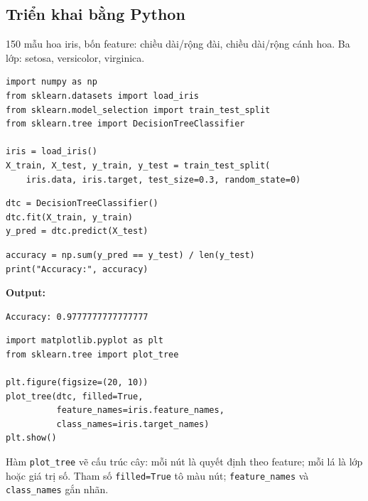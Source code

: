 \subsection{Triển khai bằng Python}

\begin{dongco}[title={Dataset Iris}]
150 mẫu hoa iris, bốn feature: chiều dài/rộng đài, chiều dài/rộng cánh hoa.
Ba lớp: setosa, versicolor, virginica.
\end{dongco}

\begin{vidu}[title={Import, nạp dữ liệu và chia tập}]
\begin{lstlisting}
import numpy as np
from sklearn.datasets import load_iris
from sklearn.model_selection import train_test_split
from sklearn.tree import DecisionTreeClassifier

iris = load_iris()
X_train, X_test, y_train, y_test = train_test_split(
    iris.data, iris.target, test_size=0.3, random_state=0)
\end{lstlisting}
\end{vidu}

\begin{vidu}[title={Huấn luyện và dự đoán}]
\begin{lstlisting}
dtc = DecisionTreeClassifier()
dtc.fit(X_train, y_train)
y_pred = dtc.predict(X_test)
\end{lstlisting}
\end{vidu}

\begin{vidu}[title={Độ chính xác}]
\begin{lstlisting}
accuracy = np.sum(y_pred == y_test) / len(y_test)
print("Accuracy:", accuracy)
\end{lstlisting}

\textbf{Output:}
\begin{verbatim}
Accuracy: 0.9777777777777777
\end{verbatim}
\end{vidu}

\begin{vidu}[title={Trực quan hóa cây}]
\begin{lstlisting}
import matplotlib.pyplot as plt
from sklearn.tree import plot_tree

plt.figure(figsize=(20, 10))
plot_tree(dtc, filled=True,
          feature_names=iris.feature_names,
          class_names=iris.target_names)
plt.show()
\end{lstlisting}

Hàm \texttt{plot\_tree} vẽ cấu trúc cây: mỗi nút là quyết định theo feature; mỗi lá là lớp hoặc giá trị số.
Tham số \texttt{filled=True} tô màu nút; \texttt{feature\_names} và \texttt{class\_names} gắn nhãn.
\end{vidu}

